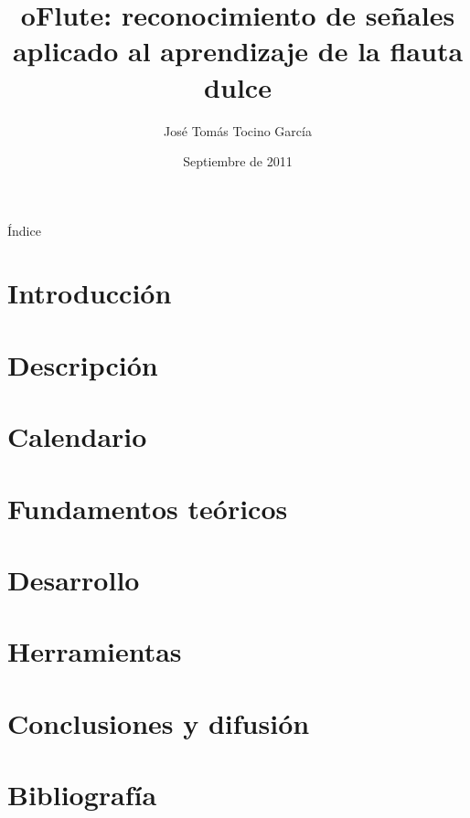 \documentclass[11pt,xcolor=svgnames]{beamer}
\title{oFlute: reconocimiento de señales aplicado al aprendizaje de la flauta
  dulce}
\author{José Tomás Tocino García}
\institute[Universidad de Cádiz]{Universidad de Cádiz}
\date[Sept 2011]{Septiembre de 2011}
\begin{document}
{
  \begin{frame}
    \titlepage
  \end{frame}
}
\normalsize


\begin{frame}{Índice}
  \tableofcontents
\end{frame}


\section{Introducción}


\section{Descripción}


\section{Calendario}


\section{Fundamentos teóricos}


\section{Desarrollo}


\section{Herramientas}


\section{Conclusiones y difusión}

\section{Bibliografía}

\end{document}
